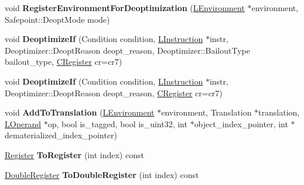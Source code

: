 \begin{DoxyCompactItemize}
\item 
void {\bfseries Register\+Environment\+For\+Deoptimization} (\hyperlink{classv8_1_1internal_1_1_l_environment}{L\+Environment} $\ast$environment, Safepoint\+::\+Deopt\+Mode mode)\hypertarget{classv8_1_1internal_1_1_l_code_gen_a8e3566b9bf7194223c47e7dac6fd6a10}{}\label{classv8_1_1internal_1_1_l_code_gen_a8e3566b9bf7194223c47e7dac6fd6a10}

\item 
void {\bfseries Deoptimize\+If} (Condition condition, \hyperlink{classv8_1_1internal_1_1_l_instruction}{L\+Instruction} $\ast$instr, Deoptimizer\+::\+Deopt\+Reason deopt\+\_\+reason, Deoptimizer\+::\+Bailout\+Type bailout\+\_\+type, \hyperlink{structv8_1_1internal_1_1_c_register}{C\+Register} cr=cr7)\hypertarget{classv8_1_1internal_1_1_l_code_gen_a4807884218296a0645bb3b70516d29b9}{}\label{classv8_1_1internal_1_1_l_code_gen_a4807884218296a0645bb3b70516d29b9}

\item 
void {\bfseries Deoptimize\+If} (Condition condition, \hyperlink{classv8_1_1internal_1_1_l_instruction}{L\+Instruction} $\ast$instr, Deoptimizer\+::\+Deopt\+Reason deopt\+\_\+reason, \hyperlink{structv8_1_1internal_1_1_c_register}{C\+Register} cr=cr7)\hypertarget{classv8_1_1internal_1_1_l_code_gen_a922127daeb0fb08e7e6d6634da5d89fa}{}\label{classv8_1_1internal_1_1_l_code_gen_a922127daeb0fb08e7e6d6634da5d89fa}

\item 
void {\bfseries Add\+To\+Translation} (\hyperlink{classv8_1_1internal_1_1_l_environment}{L\+Environment} $\ast$environment, Translation $\ast$translation, \hyperlink{classv8_1_1internal_1_1_l_operand}{L\+Operand} $\ast$op, bool is\+\_\+tagged, bool is\+\_\+uint32, int $\ast$object\+\_\+index\+\_\+pointer, int $\ast$dematerialized\+\_\+index\+\_\+pointer)\hypertarget{classv8_1_1internal_1_1_l_code_gen_a418f466c19b6671a29663f4378a36d8c}{}\label{classv8_1_1internal_1_1_l_code_gen_a418f466c19b6671a29663f4378a36d8c}

\item 
\hyperlink{structv8_1_1internal_1_1_register}{Register} {\bfseries To\+Register} (int index) const \hypertarget{classv8_1_1internal_1_1_l_code_gen_ae4d98c4f4146a2d8ea844342a5bae0ea}{}\label{classv8_1_1internal_1_1_l_code_gen_ae4d98c4f4146a2d8ea844342a5bae0ea}

\item 
\hyperlink{structv8_1_1internal_1_1_double_register}{Double\+Register} {\bfseries To\+Double\+Register} (int index) const \hypertarget{classv8_1_1internal_1_1_l_code_gen_a371876b861c4031096e632a0af70b549}{}\label{classv8_1_1internal_1_1_l_code_gen_a371876b861c4031096e632a0af70b549}


\end{DoxyCompactItemize}
